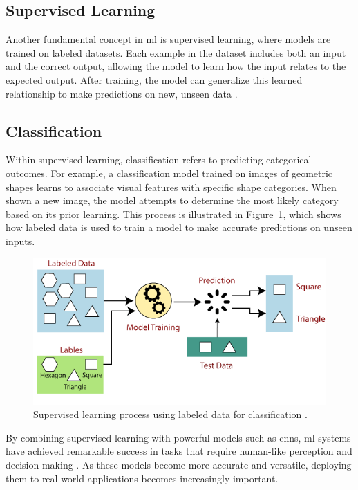 \subsection{Supervised Learning}

Another fundamental concept in \gls{ml} is supervised learning, where models are trained on labeled datasets. Each example in the dataset includes both an input and the correct output, allowing the model to learn how the input relates to the expected output. After training, the model can generalize this learned relationship to make predictions on new, unseen data \cite{geeksforgeeks:supervised-learning, google:supervised-learning}. \\

\subsection{Classification}

Within supervised learning, classification refers to predicting categorical outcomes. For example, a classification model trained on images of geometric shapes learns to associate visual features with specific shape categories. When shown a new image, the model attempts to determine the most likely category based on its prior learning. This process is illustrated in Figure~\ref{fig:supervised-learning}, which shows how labeled data is used to train a model to make accurate predictions on unseen inputs. \\

\begin{figure}[h!] 
    \centering 
    \includegraphics[width=0.75\linewidth]{figures/theory/machine-learning/supervised-learning.png} \caption[Supervised learning with labeled data]{Supervised learning process using labeled data for classification \cite{tpointtech:supervised-learning}.} 
    \label{fig:supervised-learning} 
\end{figure}

By combining supervised learning with powerful models such as \glspl{cnn}, \gls{ml} systems have achieved remarkable success in tasks that require human-like perception and decision-making \cite{chengyi:cnn}. As these models become more accurate and versatile, deploying them to real-world applications becomes increasingly important.  \\

